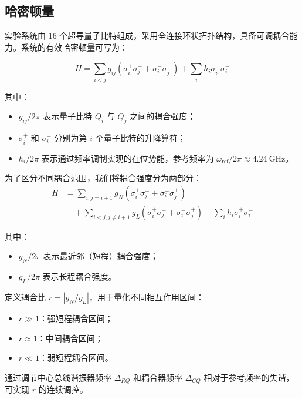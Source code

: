 \documentclass[11pt,a4paper]{article}
\begin{document}
\subsection{哈密顿量}


实验系统由 16 个超导量子比特组成，采用全连接环状拓扑结构，具备可调耦合能力。系统的有效哈密顿量可写为：

\begin{equation}
H = \sum_{i < j} g_{ij} (\sigma^{+}_{i} \sigma^{-}_{j} + \sigma^{-}_{i} \sigma^{+}_{j}) + \sum_{i} h_i \sigma^{+}_{i} \sigma^{-}_{i}
\end{equation}

其中：
\begin{itemize}
    \item $g_{ij}/2\pi$ 表示量子比特 $Q_i$ 与 $Q_j$ 之间的耦合强度；
    \item $\sigma^{+}_{i}$ 和 $\sigma^{-}_{i}$ 分别为第 $i$ 个量子比特的升降算符；
    \item $h_i/2\pi$ 表示通过频率调制实现的在位势能，参考频率为 $\omega_{\text{ref}}/2\pi \approx 4.24\ \text{GHz}$。
\end{itemize}

为了区分不同耦合范围，我们将耦合强度分为两部分：
\begin{equation}
\begin{aligned}
H &= \sum_{i, j=i+1} g_N (\sigma^{+}_{i} \sigma^{-}_{j} + \sigma^{-}_{i} \sigma^{+}_{j}) \\
&\quad + \sum_{i < j, j \neq i+1} g_L (\sigma^{+}_{i} \sigma^{-}_{j} + \sigma^{-}_{i} \sigma^{+}_{j}) + \sum_{i} h_i \sigma^{+}_{i} \sigma^{-}_{i}
\end{aligned}
\end{equation}

其中：
\begin{itemize}
    \item $g_N/2\pi$ 表示最近邻（短程）耦合强度；
    \item $g_L/2\pi$ 表示长程耦合强度。
\end{itemize}

定义耦合比 $r = |g_N / g_L|$，用于量化不同相互作用区间：
\begin{itemize}
    \item $r \gg 1$：强短程耦合区间；
    \item $r \approx 1$：中间耦合区间；
    \item $r \ll 1$：弱短程耦合区间。
\end{itemize}

通过调节中心总线谐振器频率 $\Delta_{RQ}$ 和耦合器频率 $\Delta_{CQ}$ 相对于参考频率的失谐，可实现 $r$ 的连续调控。
\end{document}
